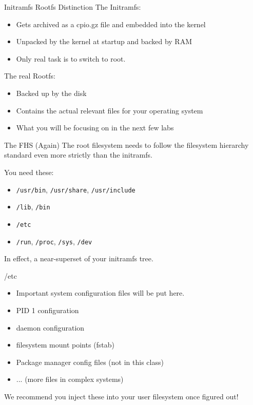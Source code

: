 \documentclass{../lecture}
\begin{document}
\begin{frame}{Initramfs Rootfs Distinction}
  The Initramfs:
  \begin{itemize}
    \item Gets archived as a cpio.gz file and embedded into the kernel
    \item Unpacked by the kernel at startup and backed by RAM
    \item Only real task is to switch to root.
  \end{itemize}
  The real Rootfs:
  \begin{itemize}
    \item Backed up by the disk
    \item Contains the actual relevant files for your operating system
    \item What you will be focusing on in the next few labs
  \end{itemize}
\end{frame}

\begin{frame}{The FHS (Again)}
  The root filesystem needs to follow the filesystem hierarchy standard even
  more strictly than the initramfs.
  \begin{block}{You need these:}
    \begin{itemize}
      \item \texttt{/usr/bin}, \texttt{/usr/share}, \texttt{/usr/include}
      \item \texttt{/lib}, \texttt{/bin}
      \item \texttt{/etc}
      \item \texttt{/run}, \texttt{/proc}, \texttt{/sys}, \texttt{/dev}
    \end{itemize}
  \end{block}
  In effect, a near-superset of your initramfs tree.
\end{frame}

\begin{frame}{/etc}
  \begin{itemize}
    \item Important system configuration files will be put here.
    \item PID 1 configuration
    \item daemon configuration
    \item filesystem mount points (fstab)
    \item Package manager config files (not in this class)
    \item ... (more files in complex systems)
  \end{itemize}
  We recommend you inject these into your user filesystem once figured out!
\end{frame}
\end{document}
